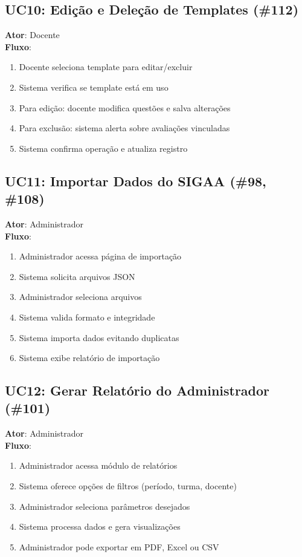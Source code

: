 \documentclass[a4paper,12pt]{article}
\begin{document}
\subsection{UC10: Edição e Deleção de Templates (\#112)}
\textbf{Ator}: Docente\\
\textbf{Fluxo}:
\begin{enumerate}
    \item Docente seleciona template para editar/excluir
    \item Sistema verifica se template está em uso
    \item Para edição: docente modifica questões e salva alterações
    \item Para exclusão: sistema alerta sobre avaliações vinculadas
    \item Sistema confirma operação e atualiza registro
\end{enumerate}

\subsection{UC11: Importar Dados do SIGAA (\#98, \#108)}
\textbf{Ator}: Administrador\\
\textbf{Fluxo}:
\begin{enumerate}
    \item Administrador acessa página de importação
    \item Sistema solicita arquivos JSON
    \item Administrador seleciona arquivos
    \item Sistema valida formato e integridade
    \item Sistema importa dados evitando duplicatas
    \item Sistema exibe relatório de importação
\end{enumerate}

\subsection{UC12: Gerar Relatório do Administrador (\#101)}
\textbf{Ator}: Administrador\\
\textbf{Fluxo}:
\begin{enumerate}
    \item Administrador acessa módulo de relatórios
    \item Sistema oferece opções de filtros (período, turma, docente)
    \item Administrador seleciona parâmetros desejados
    \item Sistema processa dados e gera visualizações
    \item Administrador pode exportar em PDF, Excel ou CSV
\end{enumerate}
\end{document}
